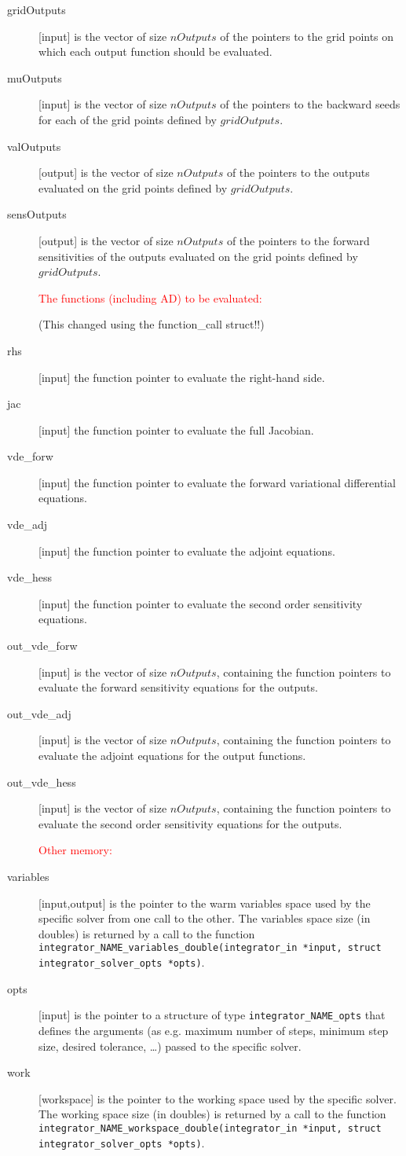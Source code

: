 \documentclass{report}
\begin{document}
\begin{description}
\item[gridOutputs] [input] is the vector of size $nOutputs$ of the pointers to the grid points on which each output function should be evaluated.
\item[muOutputs] [input] is the vector of size $nOutputs$ of the pointers to the backward seeds for each of the grid points defined by $gridOutputs$.
\item[valOutputs] [output] is the vector of size $nOutputs$ of the pointers to the outputs evaluated on the grid points defined by $gridOutputs$.
\item[sensOutputs] [output] is the vector of size $nOutputs$ of the pointers to the forward sensitivities of the outputs evaluated on the grid points defined by $gridOutputs$.
\item[] \textcolor{red}{The functions (including AD) to be evaluated:}
\item[] (This changed using the  function\_call struct!!)
\item[rhs] [input] the function pointer to evaluate the right-hand side.
\item[jac] [input] the function pointer to evaluate the full Jacobian.
\item[vde\_forw] [input] the function pointer to evaluate the forward variational differential equations.
\item[vde\_adj] [input] the function pointer to evaluate the adjoint equations.
\item[vde\_hess] [input] the function pointer to evaluate the second order sensitivity equations.
\item[out\_vde\_forw] [input] is the vector of size $nOutputs$, containing the function pointers to evaluate the forward sensitivity equations for the outputs.
\item[out\_vde\_adj] [input] is the vector of size $nOutputs$, containing the function pointers to evaluate the adjoint equations for the output functions.
\item[out\_vde\_hess] [input] is the vector of size $nOutputs$, containing the function pointers to evaluate the second order sensitivity equations for the outputs.
\item[] \textcolor{red}{Other memory:}
\item[variables] [input,output] is the pointer to the warm variables space used by the specific solver from one call to the other.
The variables space size (in doubles) is returned by a call to the function \\\texttt{integrator\_NAME\_variables\_double(integrator\_in *input, struct integrator\_solver\_opts *opts)}. 
\item[opts] [input] is the pointer to a structure of type \texttt{integrator\_NAME\_opts} that defines the arguments (as e.g. maximum number of steps, minimum step size, desired tolerance, \ldots) passed to the specific solver.
\item[work] [workspace] is the pointer to the working space used by the specific solver.
The working space size (in doubles) is returned by a call to the function \texttt{integrator\_NAME\_workspace\_double(integrator\_in *input, struct integrator\_solver\_opts *opts)}. 
\end{description}



\end{document}
